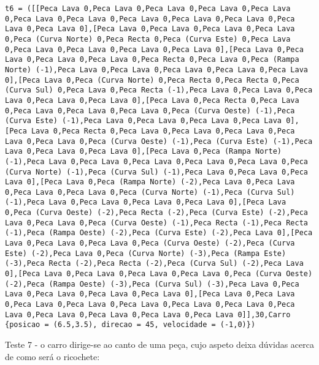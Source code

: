 \documentclass[a4paper]{report}
\begin{document}
\begin{lstlisting}
t6 = ([[Peca Lava 0,Peca Lava 0,Peca Lava 0,Peca Lava 0,Peca Lava 0,Peca Lava 0,Peca Lava 0,Peca Lava 0,Peca Lava 0,Peca Lava 0,Peca Lava 0,Peca Lava 0],[Peca Lava 0,Peca Lava 0,Peca Lava 0,Peca Lava 0,Peca (Curva Norte) 0,Peca Recta 0,Peca (Curva Este) 0,Peca Lava 0,Peca Lava 0,Peca Lava 0,Peca Lava 0,Peca Lava 0],[Peca Lava 0,Peca Lava 0,Peca Lava 0,Peca Lava 0,Peca Recta 0,Peca Lava 0,Peca (Rampa Norte) (-1),Peca Lava 0,Peca Lava 0,Peca Lava 0,Peca Lava 0,Peca Lava 0],[Peca Lava 0,Peca (Curva Norte) 0,Peca Recta 0,Peca Recta 0,Peca (Curva Sul) 0,Peca Lava 0,Peca Recta (-1),Peca Lava 0,Peca Lava 0,Peca Lava 0,Peca Lava 0,Peca Lava 0],[Peca Lava 0,Peca Recta 0,Peca Lava 0,Peca Lava 0,Peca Lava 0,Peca Lava 0,Peca (Curva Oeste) (-1),Peca (Curva Este) (-1),Peca Lava 0,Peca Lava 0,Peca Lava 0,Peca Lava 0],[Peca Lava 0,Peca Recta 0,Peca Lava 0,Peca Lava 0,Peca Lava 0,Peca Lava 0,Peca Lava 0,Peca (Curva Oeste) (-1),Peca (Curva Este) (-1),Peca Lava 0,Peca Lava 0,Peca Lava 0],[Peca Lava 0,Peca (Rampa Norte) (-1),Peca Lava 0,Peca Lava 0,Peca Lava 0,Peca Lava 0,Peca Lava 0,Peca (Curva Norte) (-1),Peca (Curva Sul) (-1),Peca Lava 0,Peca Lava 0,Peca Lava 0],[Peca Lava 0,Peca (Rampa Norte) (-2),Peca Lava 0,Peca Lava 0,Peca Lava 0,Peca Lava 0,Peca (Curva Norte) (-1),Peca (Curva Sul) (-1),Peca Lava 0,Peca Lava 0,Peca Lava 0,Peca Lava 0],[Peca Lava 0,Peca (Curva Oeste) (-2),Peca Recta (-2),Peca (Curva Este) (-2),Peca Lava 0,Peca Lava 0,Peca (Curva Oeste) (-1),Peca Recta (-1),Peca Recta (-1),Peca (Rampa Oeste) (-2),Peca (Curva Este) (-2),Peca Lava 0],[Peca Lava 0,Peca Lava 0,Peca Lava 0,Peca (Curva Oeste) (-2),Peca (Curva Este) (-2),Peca Lava 0,Peca (Curva Norte) (-3),Peca (Rampa Este) (-3),Peca Recta (-2),Peca Recta (-2),Peca (Curva Sul) (-2),Peca Lava 0],[Peca Lava 0,Peca Lava 0,Peca Lava 0,Peca Lava 0,Peca (Curva Oeste) (-2),Peca (Rampa Oeste) (-3),Peca (Curva Sul) (-3),Peca Lava 0,Peca Lava 0,Peca Lava 0,Peca Lava 0,Peca Lava 0],[Peca Lava 0,Peca Lava 0,Peca Lava 0,Peca Lava 0,Peca Lava 0,Peca Lava 0,Peca Lava 0,Peca Lava 0,Peca Lava 0,Peca Lava 0,Peca Lava 0,Peca Lava 0]],30,Carro {posicao = (6.5,3.5), direcao = 45, velocidade = (-1,0)})
\end{lstlisting}

Teste 7 - o carro dirige-se ao canto de uma peça, cujo aspeto deixa dúvidas acerca de como será o ricochete:
\end{document}

